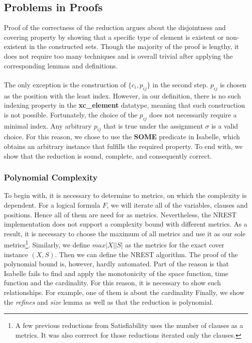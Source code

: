 \subsection*{Problems in Proofs}
Proof of the correctness of the reduction argues about the disjointness and covering property by showing that a specific type of element 
is existent or non-existent in the constructed sets. Though the majority of the proof is lengthy, it does not require too many techniques 
and is overall trivial after applying the corresponding lemmas and definitions.\\\\
The only exception is the construction of $\{c_i, p_{ij}\}$ in the second step. $p_{ij}$ is chosen as the position with the least index. However, 
in our definition, there is no such indexing property in the \textbf{xc\_element} datatype, meaning that such construction is not possible. 
Fortunately, the choice of the $p_{ij}$ does not necessarily require a minimal index. Any arbitrary $p_{ij}$ that is true under the assignment 
$\sigma$ is a valid choice. For this reason, we chose to use the \textbf{SOME} predicate in Isabelle, which obtains an arbitrary instance that fulfills
the required property. 
To end with, we show that the reduction is sound, complete, and consequently correct. 

\subsubsection{Polynomial Complexity}
To begin with, it is necessary to determine to metrics, on which the complexity is dependent. For 
a logical formula $F$, we will iterate all of the variables, clauses and positions. Hence all of them are need for as metrics. 
Nevertheless, the NREST implementation does not support a complexity bound with different metrics. As a result, it is necessary to 
choose the maximum of all metrics and use it as our sole metrics\footnote{A few previous reductions from Satisfiability uses the number of clauses 
as a metrics. It was also corrrect for those reductions iterated only the clauses.}. Similarly, we define $max |X| |S|$ as the metrics 
for the exact cover instance $(X, S)$. Then we can define the NREST algorithm.
The proof of the polynomial bound is, however, hardly automated. Part of the reason is that Isabelle fails to find and apply the monotonicity 
of the space function, time function and the cardinality. For this reason, it is necessary to show such relationships. For example, one of them is about the 
cardinality
Finally, we show the \textit{refines} and \textit{size} lemma as well as that the reduction is polynomial.

